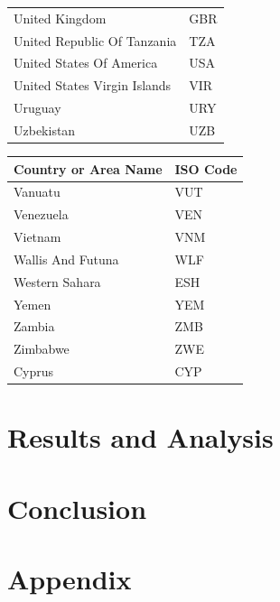 \documentclass{report}
\begin{document}
\begin{center}
\begin{minipage}{0.46\textwidth}
\begin{tabular}{|p{10.5em}|p{6em}|}
            United Kingdom & GBR\\
            United Republic Of Tanzania & TZA\\
            United States Of America & USA\\
            United States Virgin Islands & VIR\\
            Uruguay & URY\\
            Uzbekistan & UZB\\
            \hline
        \end{tabular}
    \end{minipage}
    \hfill
    \begin{minipage}{0.46\textwidth}
        \begin{tabular}{|p{10.5em}|p{6em}|}
            \hline
            Country or Area Name & ISO Code\\
            \hline
            Vanuatu & VUT\\
            Venezuela & VEN\\
            Vietnam & VNM\\
            Wallis And Futuna & WLF\\
            Western Sahara & ESH\\
            Yemen & YEM\\
            Zambia & ZMB\\
            Zimbabwe & ZWE\\
            Cyprus & CYP\\
            \hline
        \end{tabular}
    \end{minipage}
\end{center}

\newpage

\chapter{Results and Analysis}
\newpage

\chapter{Conclusion}

\newpage



\newpage

\chapter{Appendix}
\end{document}
